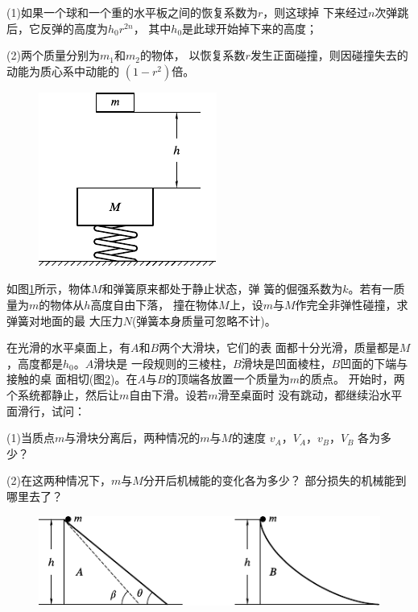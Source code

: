 \begin{exercises}
(1)如果一个球和一个重的水平板之间的恢复系数为$ r $，则这球掉
下来经过$ n $次弹跳后，它反弹的高度为$ h _ { 0 } r ^ { 2 n } $，
其中$ h _ { 0 } $是此球开始掉下来的高度；

\clearpage
(2)两个质量分别为$ m _ { 1 } $和$ m _ { 2 } $的物体，
以恢复系数$ r $发生正面碰撞，则因碰撞失去的动能为质心系中动能的
$ \left( 1 - r ^ { 2 } \right) $倍。

\begin{figure}
  \centering
  \includegraphics{figure/fig08.20}
  \caption{}
  \label{fig:08.20}
\end{figure}
\exercise 如图\ref{fig:08.20}所示，物体$ M $和弹簧原来都处于静止状态，弹
簧的倔强系数为$ k $。若有一质量为$ m $的物体从$ h $高度自由下落，
撞在物体$ M $上，设$ m $与$ M $作完全非弹性碰撞，求弹簧对地面的最
大压力$ N $(弹簧本身质量可忽略不计)。

\exercise 在光滑的水平桌面上，有$ A $和$ B $两个大滑块，它们的表
面都十分光滑，质量都是$ M $，高度都是$ h _ { 0 } $。$ A $滑块是
一段规则的三棱柱，$ B $滑块是凹面棱柱，$ B $凹面的下端与接触的桌
面相切(图\ref{fig:08.21})。在$ A $与$ B $的顶端各放置一个质量为$ m $的质点。
开始时，两个系统都静止，然后让$ m $自由下滑。设若$ m $滑至桌面时
没有跳动，都继续沿水平面滑行，试问：

(1)当质点$ m $与滑块分离后，两种情况的$ m $与$ M $的速度
$ v _ { A } $，$ V _ { A } $，$ v _ { B } $，$ V _ { B } $
各为多少？

(2)在这两种情况下，$ m $与$ M $分开后机械能的变化各为多少？
部分损失的机械能到哪里去了？
\begin{figure}[h]
  \centering
  \includegraphics{figure/fig08.21}
  \caption{}
  \label{fig:08.21}
\end{figure}


\end{exercises}
